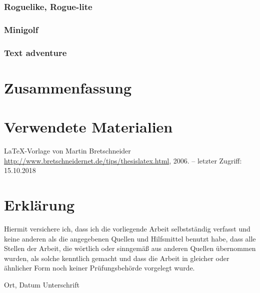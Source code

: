 \subsection{Roguelike, Rogue-lite}

\subsection{Minigolf}

\subsection{Text adventure}


\chapter{Zusammenfassung}\label{c.zusammenfassung}


\chapter{Verwendete Materialien}
\LaTeX -Vorlage von Martin Bretschneider 
\newblock \url{http://www.bretschneidernet.de/tips/thesislatex.html}, 2006. --
\newblock letzter Zugriff: 15.10.2018




\chapter{Erklärung}

Hiermit versichere ich, dass ich die vorliegende Arbeit selbstständig verfasst und keine anderen als die angegebenen Quellen und Hilfsmittel benutzt habe, dass alle Stellen der Arbeit, die wörtlich oder sinngemäß aus anderen Quellen übernommen wurden, als solche kenntlich gemacht und dass die Arbeit in gleicher oder ähnlicher Form noch keiner Prüfungsbehörde vorgelegt wurde.

\vspace{3cm}
Ort, Datum \hspace{5cm} Unterschrift \\

